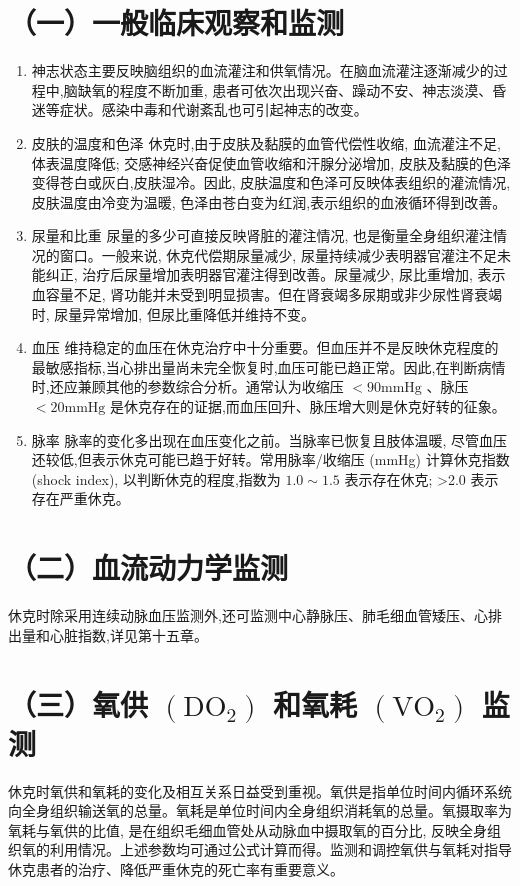 \documentclass[10pt]{article}
\begin{document}
\section*{（一）一般临床观察和监测}
\begin{enumerate}
  \item 神志状态主要反映脑组织的血流灌注和供氧情况。在脑血流灌注逐渐减少的过程中,脑缺氧的程度不断加重, 患者可依次出现兴奋、躁动不安、神志淡漠、昏迷等症状。感染中毒和代谢紊乱也可引起神志的改变。

  \item 皮肤的温度和色泽 休克时,由于皮肤及黏膜的血管代偿性收缩, 血流灌注不足,体表温度降低; 交感神经兴奋促使血管收缩和汗腺分泌增加, 皮肤及黏膜的色泽变得苍白或灰白,皮肤湿冷。因此, 皮肤温度和色泽可反映体表组织的灌流情况, 皮肤温度由冷变为温暖, 色泽由苍白变为红润,表示组织的血液循环得到改善。

  \item 尿量和比重 尿量的多少可直接反映肾脏的灌注情况, 也是衡量全身组织灌注情况的窗口。一般来说, 休克代偿期尿量减少, 尿量持续减少表明器官灌注不足未能纠正, 治疗后尿量增加表明器官灌注得到改善。尿量减少, 尿比重增加, 表示血容量不足, 肾功能并未受到明显损害。但在肾衰竭多尿期或非少尿性肾衰竭时, 尿量异常增加, 但尿比重降低并维持不变。

  \item 血压 维持稳定的血压在休克治疗中十分重要。但血压并不是反映休克程度的最敏感指标,当心排出量尚未完全恢复时,血压可能已趋正常。因此,在判断病情时,还应兼顾其他的参数综合分析。通常认为收缩压 $<90 \mathrm{mmHg}$ 、脉压 $<20 \mathrm{mmHg}$ 是休克存在的证据,而血压回升、脉压增大则是休克好转的征象。

  \item 脉率 脉率的变化多出现在血压变化之前。当脉率已恢复且肢体温暖, 尽管血压还较低,但表示休克可能已趋于好转。常用脉率/收缩压 (mmHg) 计算休克指数(shock index), 以判断休克的程度,指数为 $1.0 \sim 1.5$ 表示存在休克; >2.0 表示存在严重休克。

\end{enumerate}

\section*{（二）血流动力学监测}
休克时除采用连续动脉血压监测外,还可监测中心静脉压、肺毛细血管矮压、心排出量和心脏指数,详见第十五章。

\section*{（三）氧供 $\left(\mathrm{DO}_{2}\right)$ 和氧耗 $\left(\mathrm{VO}_{2}\right)$ 监测}
休克时氧供和氧耗的变化及相互关系日益受到重视。氧供是指单位时间内循环系统向全身组织输送氧的总量。氧耗是单位时间内全身组织消耗氧的总量。氧摄取率为氧耗与氧供的比值, 是在组织毛细血管处从动脉血中摄取氧的百分比, 反映全身组织氧的利用情况。上述参数均可通过公式计算而得。监测和调控氧供与氧耗对指导休克患者的治疗、降低严重休克的死亡率有重要意义。
\end{document}
